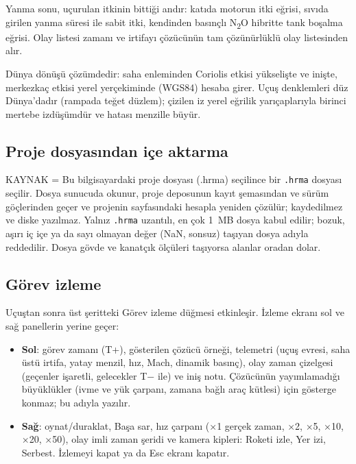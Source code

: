\documentclass[11pt,a4paper]{article}
\newcommand{\ui}[1]{\textsf{#1}}
\newcommand{\kod}[1]{\texttt{#1}}
\begin{document}
Yanma sonu, uçurulan itkinin bittiği andır: katıda motorun itki eğrisi,
sıvıda girilen yanma süresi ile sabit itki, kendinden basınçlı
N\textsubscript{2}O hibritte tank boşalma eğrisi. Olay listesi zamanı ve
irtifayı çözücünün tam çözünürlüklü olay listesinden alır.

Dünya dönüşü çözümdedir: saha enleminden Coriolis etkisi yükselişte ve
inişte, merkezkaç etkisi yerel yerçekiminde (WGS84) hesaba girer. Uçuş
denklemleri düz Dünya'dadır (rampada teğet düzlem); çizilen iz yerel eğrilik
yarıçaplarıyla birinci mertebe izdüşümdür ve hatası menzille büyür.

\subsection{Proje dosyasından içe aktarma}\label{sec:saha-dosya}

\ui{KAYNAK} = \ui{Bu bilgisayardaki proje dosyası (.hrma)} seçilince bir
\kod{.hrma} dosyası seçilir. Dosya sunucuda okunur, proje deposunun kayıt
şemasından ve sürüm göçlerinden geçer ve projenin sayfasındaki hesapla
yeniden çözülür; kaydedilmez ve diske yazılmaz. Yalnız \kod{.hrma} uzantılı,
en çok 1~MB dosya kabul edilir; bozuk, aşırı iç içe ya da sayı olmayan değer
(NaN, sonsuz) taşıyan dosya adıyla reddedilir. Dosya gövde ve kanatçık
ölçüleri taşıyorsa alanlar oradan dolar.

\subsection{Görev izleme}\label{sec:saha-izleme}

Uçuştan sonra üst şeritteki \ui{Görev izleme} düğmesi etkinleşir. İzleme
ekranı sol ve sağ panellerin yerine geçer:

\begin{itemize}[leftmargin=1.4em]
  \item \textbf{Sol}: görev zamanı (T+), gösterilen çözücü örneği, telemetri
  (uçuş evresi, saha üstü irtifa, yatay menzil, hız, Mach, dinamik basınç),
  olay zaman çizelgesi (geçenler işaretli, gelecekler T$-$ ile) ve iniş notu.
  Çözücünün yayımlamadığı büyüklükler (ivme ve yük çarpanı, zamana bağlı araç
  kütlesi) için gösterge konmaz; bu adıyla yazılır.
  \item \textbf{Sağ}: oynat/duraklat, \ui{Başa sar}, hız çarpanı (×1 gerçek
  zaman, ×2, ×5, ×10, ×20, ×50), olay imli zaman şeridi ve kamera kipleri:
  \ui{Roketi izle}, \ui{Yer izi}, \ui{Serbest}. \ui{İzlemeyi kapat} ya da Esc
  ekranı kapatır.
\end{itemize}
\end{document}
